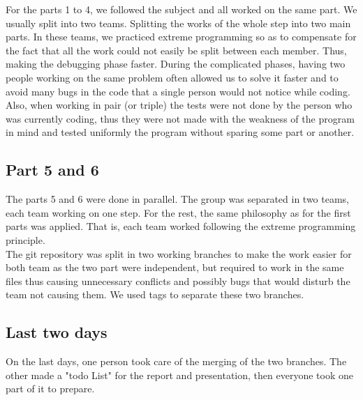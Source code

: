 For the parts 1 to 4, we followed the subject and all worked on the same part.
We usually split into two teams. Splitting the works of the whole step into
two main parts. In these teams, we practiced extreme programming so as to
compensate for the fact that all the work could not easily be split between
each member. Thus, making the debugging phase faster. During the complicated
phases, having two people working on the same problem often allowed us to
solve it faster and to avoid many bugs in the code that a single person would
not notice while coding.\\
Also, when working in pair (or triple) the tests were not done by the person
who was currently coding, thus they were not made with the weakness of the
program in mind and tested uniformly the program without sparing some part or
another.

\subsection{Part 5 and 6}

The parts 5 and 6 were done in parallel. The group was separated in two teams,
each team working on one step.  For the rest, the same philosophy as for the
first parts was applied. That is, each team worked following the extreme
programming principle.\\
The git repository was split in two working branches to make the work easier
for both team as the two part were independent, but required to work in the same
files thus causing unnecessary conflicts and possibly bugs that would disturb
the team not causing them. We used tags to separate these two branches.

\subsection{Last two days}

On the last days, one person took care of the merging of the two branches. The
other made a "todo List" for the report and presentation, then everyone took
one part of it to prepare. 
